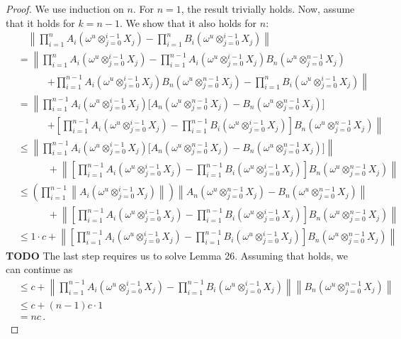 \documentclass[a4paper,reqno]{amsart}
\newcommand{\norm}[1]{\left\lVert #1 \right\rVert}
\begin{document}
\begin{proof}
We use induction on $n$. For $n=1$, the result trivially holds. Now, assume that it holds for $k=n-1$. We show that it also holds for $n$:
\begin{align*}
&\quad \norm{\prod_{i=1}^n A_i(\omega^u\otimes_{j=0}^{i-1}X_j) - \prod_{i=1}^n B_i(\omega^u\otimes_{j=0}^{i-1}X_j)} \\
 &= \left\lVert\prod_{i=1}^n A_i(\omega^u\otimes_{j=0}^{i-1}X_j) - \prod_{i=1}^{n-1} A_i(\omega^u\otimes_{j=0}^{i-1}X_j)B_n(\omega^u\otimes_{j=0}^{n-1}X_j) \right. \\
 &\quad\quad\quad \left.+ \prod_{i=1}^{n-1} A_i(\omega^u\otimes_{j=0}^{i-1}X_j)B_n(\omega^u\otimes_{j=0}^{n-1}X_j) - \prod_{i=1}^n B_i(\omega^u\otimes_{j=0}^{i-1}X_j)\right\lVert \\
 &= \left\lVert\prod_{i=1}^{n-1} A_i(\omega^u\otimes_{j=0}^{i-1}X_j)\bigl[A_n(\omega^u\otimes_{j=0}^{n-1}X_j) - B_n(\omega^u\otimes_{j=0}^{n-1}X_j)\bigr] \right. \\
 &\quad\quad\quad \left.+ \left[\prod_{i=1}^{n-1} A_i(\omega^u\otimes_{j=0}^{i-1}X_j) - \prod_{i=1}^{n-1} B_i(\omega^u\otimes_{j=0}^{i-1}X_j)\right]B_n(\omega^u\otimes_{j=0}^{n-1}X_j)\right\lVert \\
 &\leq \norm{\prod_{i=1}^{n-1} A_i(\omega^u\otimes_{j=0}^{i-1}X_j)\bigl[A_n(\omega^u\otimes_{j=0}^{n-1}X_j) - B_n(\omega^u\otimes_{j=0}^{n-1}X_j)\bigr] } \\
 &\quad\quad\quad + \norm{\left[\prod_{i=1}^{n-1} A_i(\omega^u\otimes_{j=0}^{i-1}X_j) - \prod_{i=1}^{n-1} B_i(\omega^u\otimes_{j=0}^{i-1}X_j)\right]B_n(\omega^u\otimes_{j=0}^{n-1}X_j)} \\
 &\leq \left(\prod_{i=1}^{n-1} \norm{A_i(\omega^u\otimes_{j=0}^{i-1}X_j)}\right)\norm{A_n(\omega^u\otimes_{j=0}^{n-1}X_j) - B_n(\omega^u\otimes_{j=0}^{n-1}X_j) } \\
 &\quad\quad\quad + \norm{\left[\prod_{i=1}^{n-1} A_i(\omega^u\otimes_{j=0}^{i-1}X_j) - \prod_{i=1}^{n-1} B_i(\omega^u\otimes_{j=0}^{i-1}X_j)\right]B_n(\omega^u\otimes_{j=0}^{n-1}X_j)} \\
 &\leq 1\cdot c + \norm{\left[\prod_{i=1}^{n-1} A_i(\omega^u\otimes_{j=0}^{i-1}X_j) - \prod_{i=1}^{n-1} B_i(\omega^u\otimes_{j=0}^{i-1}X_j)\right]B_n(\omega^u\otimes_{j=0}^{n-1}X_j)} 
\end{align*}
{\bf TODO} The last step requires us to solve Lemma 26. Assuming that holds, we can continue as
\begin{align*}
&\leq c + \norm{\prod_{i=1}^{n-1} A_i(\omega^u\otimes_{j=0}^{i-1}X_j) - \prod_{i=1}^{n-1} B_i(\omega^u\otimes_{j=0}^{i-1}X_j)}\norm{B_n(\omega^u\otimes_{j=0}^{n-1}X_j)} \\
&\leq c + (n-1)c\cdot 1 \\
&= nc\,. 
\end{align*}
\end{proof}
\end{document}
